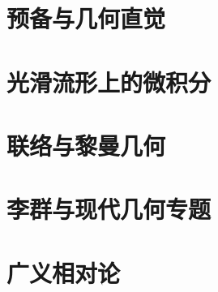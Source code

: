 \part{预备与几何直觉}


\part{光滑流形上的微积分}







\part{联络与黎曼几何}





\part{李群与现代几何专题}






\part{广义相对论}



